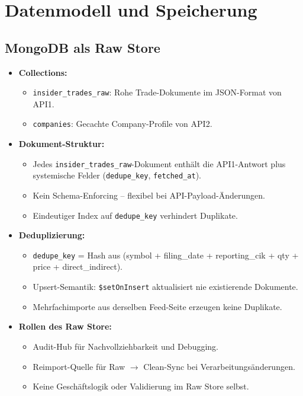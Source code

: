 \section{Datenmodell und Speicherung}

\subsection{MongoDB als Raw Store}
\begin{itemize}
  \item \textbf{Collections:}
    \begin{itemize}
      \item \texttt{insider\_trades\_raw}: Rohe Trade-Dokumente im JSON-Format von API1.
      \item \texttt{companies}: Gecachte Company-Profile von API2.
    \end{itemize}
  \item \textbf{Dokument-Struktur:}
    \begin{itemize}
      \item Jedes \texttt{insider\_trades\_raw}-Dokument enthält die API1-Antwort plus systemische Felder (\texttt{dedupe\_key}, \texttt{fetched\_at}).
      \item Kein Schema-Enforcing -- flexibel bei API-Payload-Änderungen.
      \item Eindeutiger Index auf \texttt{dedupe\_key} verhindert Duplikate. %
    \end{itemize}
  \item \textbf{Deduplizierung:}
    \begin{itemize}
      \item \texttt{dedupe\_key} = Hash aus (symbol + filing\_date + reporting\_cik + qty + price + direct\_indirect). %
      \item Upsert-Semantik: \texttt{\$setOnInsert} aktualisiert nie existierende Dokumente. %
      \item Mehrfachimporte aus derselben Feed-Seite erzeugen keine Duplikate.
    \end{itemize}
  \item \textbf{Rollen des Raw Store:}
    \begin{itemize}
      \item Audit-Hub für Nachvollziehbarkeit und Debugging.
      \item Reimport-Quelle für Raw $\rightarrow$ Clean-Sync bei Verarbeitungsänderungen.
      \item Keine Geschäftslogik oder Validierung im Raw Store selbst.
    \end{itemize}
\end{itemize}

